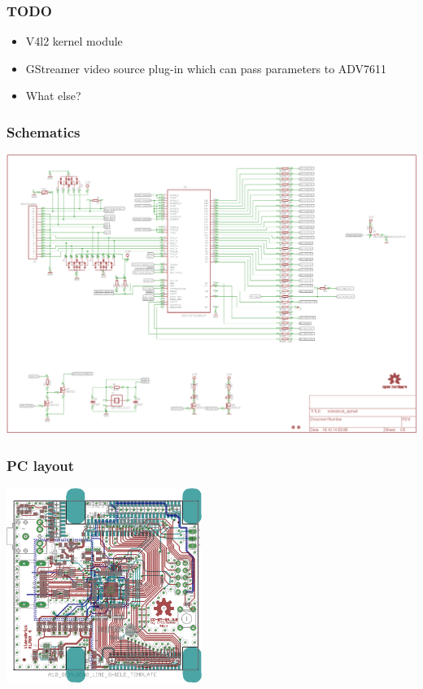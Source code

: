 \documentclass{beamer}
\begin{document}
\begin{frame} %

  \frametitle{TODO}
  \begin{itemize}
  \item V4l2 kernel module
  \item GStreamer video source plug-in which can pass parameters to ADV7611
  \item What else?
  \end{itemize}

\end{frame}

\begin{frame} %

  \frametitle{Schematics}
  \begin{center}
    \includegraphics[width=\textwidth]{videobrick_sch.png}
  \end{center}

\end{frame}

\begin{frame} %

  \frametitle{PC layout}
  \begin{center}
    \includegraphics[width=240px]{videobrick_pcb.png}
  \end{center}

\end{frame}
\end{document}
